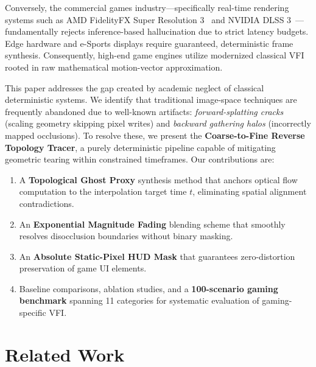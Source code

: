 \documentclass{article}
\begin{document}
Conversely, the commercial games industry---specifically real-time rendering systems such as AMD FidelityFX Super Resolution 3~\cite{amd2023fsr3} and NVIDIA DLSS 3~\cite{nvidia2022dlss3}---fundamentally rejects inference-based hallucination due to strict latency budgets. Edge hardware and e-Sports displays require guaranteed, deterministic frame synthesis. Consequently, high-end game engines utilize modernized classical VFI rooted in raw mathematical motion-vector approximation.

This paper addresses the gap created by academic neglect of classical deterministic systems. We identify that traditional image-space techniques are frequently abandoned due to well-known artifacts: \textit{forward-splatting cracks} (scaling geometry skipping pixel writes) and \textit{backward gathering halos} (incorrectly mapped occlusions). To resolve these, we present the \textbf{Coarse-to-Fine Reverse Topology Tracer}, a purely deterministic pipeline capable of mitigating geometric tearing within constrained timeframes. Our contributions are:

\begin{enumerate}
    \item A \textbf{Topological Ghost Proxy} synthesis method that anchors optical flow computation to the interpolation target time $t$, eliminating spatial alignment contradictions.
    \item An \textbf{Exponential Magnitude Fading} blending scheme that smoothly resolves disocclusion boundaries without binary masking.
    \item An \textbf{Absolute Static-Pixel HUD Mask} that guarantees zero-distortion preservation of game UI elements.
    \item Baseline comparisons, ablation studies, and a \textbf{100-scenario gaming benchmark} spanning 11 categories for systematic evaluation of gaming-specific VFI.
\end{enumerate}

\section{Related Work}
\end{document}
